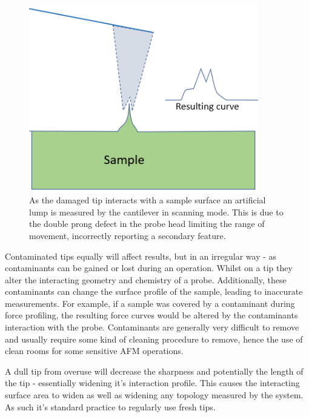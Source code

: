 \begin{figure}[h!]     %
        \begin{center}
          \includegraphics[width=100mm]{chapter2/BrokenTip.PNG}
\end{center}
\caption{As the damaged tip interacts with a sample surface an artificial lump is measured by the cantilever in scanning mode. This is due to the double prong defect in the probe head limiting the range of movement, incorrectly reporting a secondary feature.}
\label{fig:BrokenTip}                 %
\end{figure}

Contaminated tips equally will affect results, but in an irregular way - as contaminants can be gained or lost during an operation. Whilst on a tip they alter the interacting geometry and chemistry of a probe. Additionally, these contaminants can change the surface profile of the sample, leading to inaccurate measurements. For example, if a sample was covered by a contaminant during force profiling, the resulting force curves would be altered by the contaminants interaction with the probe. Contaminants are generally very difficult to remove and usually require some kind of cleaning procedure to remove, hence the use of clean rooms for some sensitive AFM operations.

A dull tip from overuse will decrease the sharpness and potentially the length of the tip - essentially widening it's interaction profile. This causes the interacting surface area to widen as well as widening any topology measured by the system. As such it's standard practice to regularly use fresh tips.


